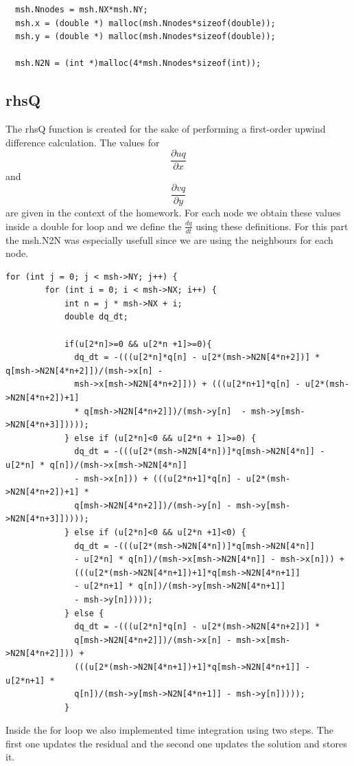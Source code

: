 \documentclass{article}
\begin{document}
\begin{verbatim}
  msh.Nnodes = msh.NX*msh.NY;
  msh.x = (double *) malloc(msh.Nnodes*sizeof(double));
  msh.y = (double *) malloc(msh.Nnodes*sizeof(double));

  msh.N2N = (int *)malloc(4*msh.Nnodes*sizeof(int));
\end{verbatim}

\subsection{rhsQ}

The rhsQ function is created for the sake of performing a first-order upwind difference calculation. The values for \[\frac{\partial{uq}}{\partial{x}}\] and \[\frac{\partial{vq}}{\partial{y}}\] 
are given in the context of the homework. For each node we obtain these values inside a double for loop and we define the $\frac{dq}{dt}$ using these definitions. For this part the msh.N2N was especially usefull since we are using the neighbours for each node.
\begin{verbatim}
for (int j = 0; j < msh->NY; j++) {
        for (int i = 0; i < msh->NX; i++) {
            int n = j * msh->NX + i;
            double dq_dt;

            if(u[2*n]>=0 && u[2*n +1]>=0){
              dq_dt = -(((u[2*n]*q[n] - u[2*(msh->N2N[4*n+2])] * q[msh->N2N[4*n+2]])/(msh->x[n] - 
              msh->x[msh->N2N[4*n+2]])) + (((u[2*n+1]*q[n] - u[2*(msh->N2N[4*n+2])+1] 
              * q[msh->N2N[4*n+2]])/(msh->y[n]  - msh->y[msh->N2N[4*n+3]]))));
            } else if (u[2*n]<0 && u[2*n + 1]>=0) {
              dq_dt = -(((u[2*(msh->N2N[4*n])]*q[msh->N2N[4*n]] - u[2*n] * q[n])/(msh->x[msh->N2N[4*n]] 
              - msh->x[n])) + (((u[2*n+1]*q[n] - u[2*(msh->N2N[4*n+2])+1] * 
              q[msh->N2N[4*n+2]])/(msh->y[n] - msh->y[msh->N2N[4*n+3]]))));
            } else if (u[2*n]<0 && u[2*n +1]<0) {
              dq_dt = -(((u[2*(msh->N2N[4*n])]*q[msh->N2N[4*n]] 
              - u[2*n] * q[n])/(msh->x[msh->N2N[4*n]] - msh->x[n])) + 
              (((u[2*(msh->N2N[4*n+1])+1]*q[msh->N2N[4*n+1]]
              - u[2*n+1] * q[n])/(msh->y[msh->N2N[4*n+1]] 
              - msh->y[n]))));
            } else {
              dq_dt = -(((u[2*n]*q[n] - u[2*(msh->N2N[4*n+2])] * 
              q[msh->N2N[4*n+2]])/(msh->x[n] - msh->x[msh->N2N[4*n+2]])) +
              (((u[2*(msh->N2N[4*n+1])+1]*q[msh->N2N[4*n+1]] - u[2*n+1] *
              q[n])/(msh->y[msh->N2N[4*n+1]] - msh->y[n]))));
            }
\end{verbatim}
Inside the for loop we also implemented time integration using two steps. The first one updates the residual and the second one updates the solution and stores it.
\end{document}
